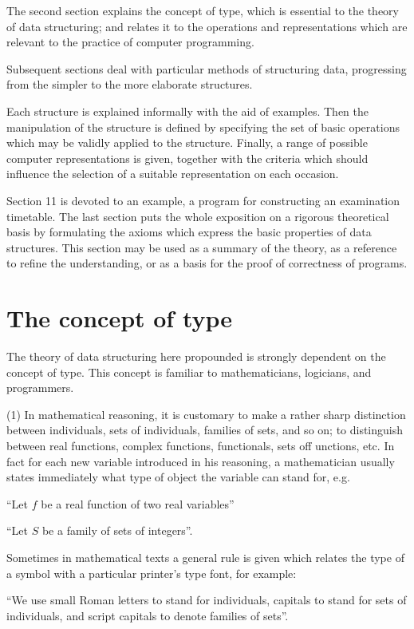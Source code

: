 The second section explains the concept of type, which is essential to the theory of data structuring; and relates it to the operations and representations which are relevant to the practice of computer programming.

Subsequent sections deal with particular methods of structuring data, progressing from the simpler to the more elaborate structures.

Each structure is explained informally with the aid of examples. Then the manipulation of the structure is defined by specifying the set of basic operations which may be validly applied to the structure. Finally, a range of possible computer representations is given, together with the criteria which should influence the selection of a suitable representation on each occasion.

Section 11 is devoted to an example, a program for constructing an examination timetable. The last section puts the whole exposition on a rigorous theoretical basis by formulating the axioms which express the basic properties of data structures. This section may be used as a summary of the theory, as a reference to refine the understanding, or as a basis for the proof of correctness of programs.

\section{The concept of type}

The theory of data structuring here propounded is strongly dependent on the concept of type. This concept is familiar to mathematicians, logicians, and programmers.

(1) In mathematical reasoning, it is customary to make a rather sharp distinction between individuals, sets of individuals, families of sets, and so on; to distinguish between real functions, complex functions, functionals, sets off unctions, etc. In fact for each new variable introduced in his reasoning, a mathematician usually states immediately what type of object the variable can stand for, e.g.

\quad ``Let $f$ be a real function of two real variables''

\quad ``Let $S$ be a family of sets of integers''.

Sometimes in mathematical texts a general rule is given which relates the type of a symbol with a particular printer's type font, for example:

\parindent \quad``We use small Roman letters to stand for individuals, capitals to stand for sets of individuals, and script capitals to denote families of sets''.

